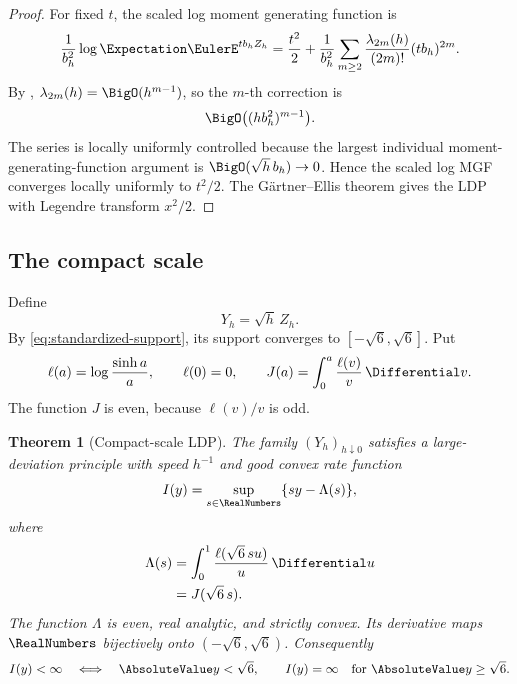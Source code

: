 \documentclass[11pt]{article}
\numberwithin{equation}{section}
\newtheorem{theorem}{Theorem}[section]
\theoremstyle{definition}
\begin{document}
\begin{proof}
For fixed \(t\), the scaled log moment generating function is
\[
 \frac1{b_h^2}\log\Expectation\EulerE^{tb_hZ_h}
 =\frac{t^2}{2}
 +\frac1{b_h^2}\sum_{m\ge2}\frac{\lambda_{2m}(h)}{(2m)!}(tb_h)^{2m}.
\]
By , \(\lambda_{2m}(h)=\BigO(h^{m-1})\), so the \(m\)-th correction is
\[
 \BigO\bigl((hb_h^2)^{m-1}\bigr).
\]
The series is locally uniformly controlled because the largest individual moment-generating-function argument is \(\BigO(\sqrt h\,b_h)\to0\).  Hence the scaled log MGF converges locally uniformly to \(t^2/2\).  The G\"artner--Ellis theorem \cite{DemboZeitouni} gives the LDP with Legendre transform \(x^2/2\).
\end{proof}

\subsection{The compact scale}
Define
\begin{equation}\label{eq:Yh}
 Y_h=\sqrt h\,Z_h.
\end{equation}
By \eqref{eq:standardized-support}, its support converges to \([-\sqrt6,\sqrt6]\).  Put
\begin{equation}\label{eq:ell-J}
 \ell(a)=\log\frac{\sinh a}{a},\qquad \ell(0)=0,
 \qquad
 J(a)=\int_0^a\frac{\ell(v)}{v}\,\Differential v.
\end{equation}
The function \(J\) is even, because \(\ell(v)/v\) is odd.

\begin{theorem}[Compact-scale LDP]\label{thm:compact-ldp}
The family \((Y_h)_{h\downarrow0}\) satisfies a large-deviation principle with speed \(h^{-1}\) and good convex rate function
\begin{equation}\label{eq:rate-legendre}
 I(y)=\sup_{s\in\RealNumbers}\{sy-\Lambda(s)\},
\end{equation}
where
\begin{align}
 \Lambda(s)
 &=\int_0^1\frac{\ell(\sqrt6\,su)}{u}\,\Differential u\label{eq:Lambda-integral}\\
 &=J(\sqrt6\,s).\label{eq:Lambda-J}
\end{align}
The function \(\Lambda\) is even, real analytic, and strictly convex.  Its derivative maps \(\RealNumbers\) bijectively onto \((-\sqrt6,\sqrt6)\).  Consequently
\begin{equation}\label{eq:rate-support}
 I(y)<\infty\quad\Longleftrightarrow\quad \AbsoluteValue y<\sqrt6,
 \qquad
 I(y)=\infty\quad\text{for }\AbsoluteValue y\ge\sqrt6.
\end{equation}
\end{theorem}
\end{document}
